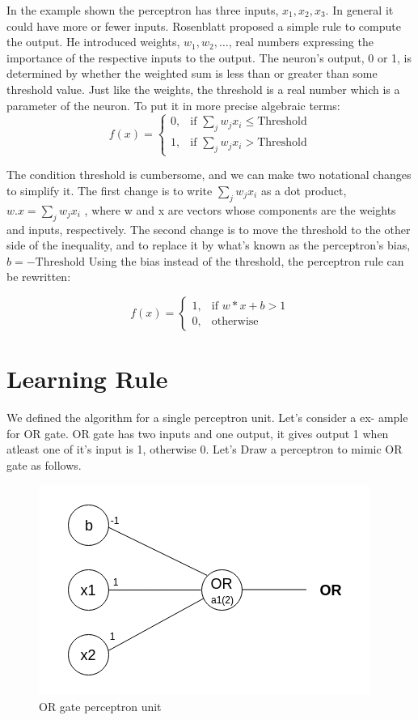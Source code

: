 \documentclass[a4paper,12pt]{report}
\begin{document}
In the example shown the perceptron has three inputs, $x_1,x_2,x_3$. In general it could have more or fewer inputs. Rosenblatt proposed a simple rule to compute the output. He introduced weights, $w_1,w_2,…$, real numbers expressing the importance of the respective inputs to the output. The neuron's output, 0 or 1, is determined by whether the weighted sum is less than or greater than some threshold value. Just like the weights, the threshold is a real number which is a parameter of the neuron. To put it in more precise algebraic terms:
\begin{equation}
f(x)=
\begin{cases}
    0,& \text{if } \sum_j{w_j x_i} \leq \text{Threshold}\\
    1, & \text{if }  \sum_j{w_j x_i} > \text{Threshold}
\end{cases}
\end{equation}

The condition threshold is cumbersome, and we can make two notational changes to simplify it. The first change is to write $\sum_j{w_j x_i}$ as a dot product, $w.x=\sum_j{w_j x_i}$ , where w and x are vectors whose components are the weights and inputs, respectively. The second change is to move the threshold to the other side of the inequality, and to replace it by what's known as the perceptron's bias, $b=- \text{Threshold}$  Using the bias instead of the threshold, the perceptron rule can be rewritten:

\begin{equation}
f(x)=
\begin{cases}
    1,& \text{if } w*x+b > 1\\
    0,              & \text{otherwise}
\end{cases}
\end{equation}

\section{Learning Rule}
We defined the algorithm for a single perceptron unit. Let’s consider a ex-
ample for OR gate. OR gate has two inputs and one output, it gives output
1 when atleast one of it’s input is 1, otherwise 0. Let’s Draw a perceptron
to mimic OR gate as follows.
\begin{figure}[htp]
\centering
\includegraphics[scale=0.4]{resources/image-02.png}
\caption{OR gate perceptron unit}
\label{}
\end{figure}
\end{document}

